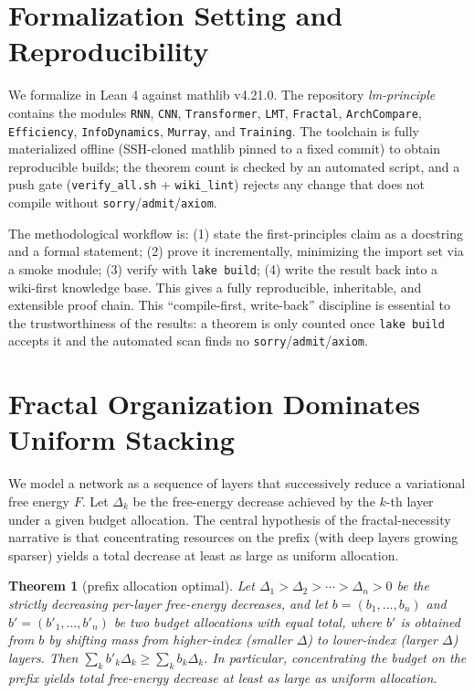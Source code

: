 \documentclass[journal]{IEEEtran}
\newtheorem{theorem}{Theorem}
\begin{document}
\section{Formalization Setting and Reproducibility}
\label{sec:setting}
We formalize in Lean 4 \cite{lean4} against mathlib v4.21.0. The repository
\emph{lm-principle} contains the modules \texttt{RNN}, \texttt{CNN},
\texttt{Transformer}, \texttt{LMT}, \texttt{Fractal}, \texttt{ArchCompare},
\texttt{Efficiency}, \texttt{InfoDynamics}, \texttt{Murray}, and
\texttt{Training}. The toolchain is fully materialized offline (SSH-cloned
mathlib pinned to a fixed commit) to obtain reproducible builds; the theorem
count is checked by an automated script, and a push gate
(\texttt{verify\_all.sh} + \texttt{wiki\_lint}) rejects any change that does not
compile without \texttt{sorry}/\texttt{admit}/\texttt{axiom}.

The methodological workflow is: (1) state the first-principles claim as a
docstring and a formal statement; (2) prove it incrementally, minimizing the
import set via a smoke module; (3) verify with \texttt{lake build}; (4) write
the result back into a wiki-first knowledge base. This gives a fully
reproducible, inheritable, and extensible proof chain. This ``compile-first,
write-back'' discipline is essential to the trustworthiness of the results: a
theorem is only counted once \texttt{lake build} accepts it and the automated
scan finds no \texttt{sorry}/\texttt{admit}/\texttt{axiom}.

\section{Fractal Organization Dominates Uniform Stacking}
\label{sec:fractal}
We model a network as a sequence of layers that successively reduce a
variational free energy $F$. Let $\Delta_k$ be the free-energy decrease
achieved by the $k$-th layer under a given budget allocation. The central
hypothesis of the fractal-necessity narrative is that concentrating resources on
the prefix (with deep layers growing sparser) yields a total decrease at least
as large as uniform allocation.

\begin{theorem}[prefix allocation optimal]
\label{thm:prefix}
Let $\Delta_1>\Delta_2>\cdots>\Delta_n>0$ be the strictly decreasing per-layer
free-energy decreases, and let $b=(b_1,\ldots,b_n)$ and $b'=(b'_1,\ldots,b'_n)$
be two budget allocations with equal total, where $b'$ is obtained from $b$ by
shifting mass from higher-index (smaller $\Delta$) to lower-index (larger
$\Delta$) layers. Then $\sum_k b'_k\Delta_k \ge \sum_k b_k\Delta_k$. In
particular, concentrating the budget on the prefix yields total free-energy
decrease at least as large as uniform allocation.
\end{theorem}
\end{document}
